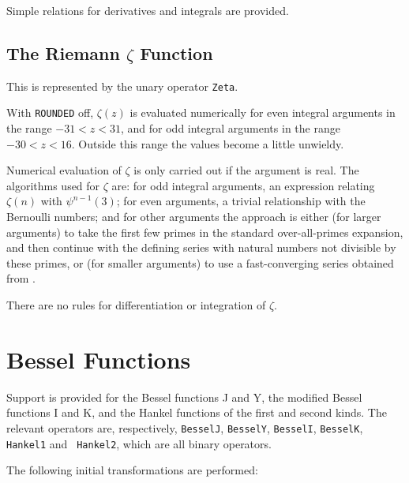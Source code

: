 \documentclass[11pt]{article}
\begin{document}
Simple relations for derivatives and integrals are provided.


\subsection{The Riemann $\zeta$ Function}

This is represented by the unary operator {\tt Zeta}.

With {\tt ROUNDED} off, $\zeta(z)$ is evaluated numerically for even
integral arguments in the range $-31 < z < 31$, and for odd integral
arguments in the range $-30 < z < 16$.  Outside this range the values
become a little unwieldy.

Numerical evaluation of $\zeta$ is only carried out if the argument is real.
The algorithms used for $\zeta$ are: for odd integral arguments, an
expression relating $\zeta(n)$ with $\psi^{n-1}(3)$; for even arguments, a
trivial relationship with the Bernoulli numbers; and for other arguments the
approach is either (for larger arguments) to take the first few primes in
the standard over-all-primes expansion, and then continue with the defining
series with natural numbers not divisible by these primes, or (for smaller
arguments) to use a fast-converging series obtained from \cite{Bender:78}.

There are no rules for differentiation or integration of $\zeta$.


\section{Bessel Functions}

Support is provided for the Bessel functions J and Y, the modified
Bessel functions I and K, and the Hankel functions of the first and
second kinds.  The relevant operators are, respectively, {\tt BesselJ},
{\tt BesselY}, {\tt BesselI}, {\tt BesselK}, {\tt Hankel1} and {\tt
Hankel2}, which are all binary operators.

The following initial transformations are performed:
\end{document}
